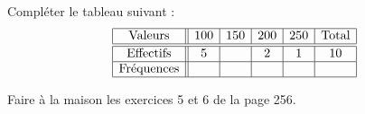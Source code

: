 
\begin{exercice}\label{exosmath-0536}

    Compléter le tableau suivant :
    \begin{equation*}
        \begin{array}[]{|c||c|c|c|c|c|}
            \hline
            \text{Valeurs}&100&150&200&250&\text{Total}\\
            \hline\hline
            \text{Effectifs}&5&&2&1&10\\
            \hline
            \text{Fréquences}&&&&&\\
            \hline
        \end{array}
    \end{equation*}
    
    Faire à la maison les exercices 5 et 6 de la page 256.

\end{exercice}

